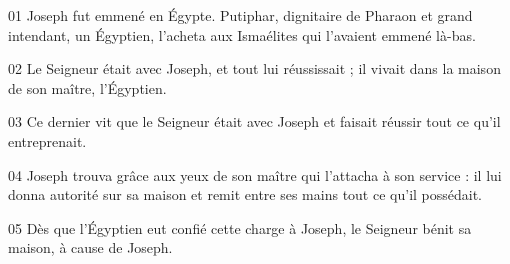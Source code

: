 01 Joseph fut emmené en Égypte. Putiphar, dignitaire de Pharaon et grand intendant, un Égyptien, l’acheta aux Ismaélites qui l’avaient emmené là-bas.

02 Le Seigneur était avec Joseph, et tout lui réussissait ; il vivait dans la maison de son maître, l’Égyptien.

03 Ce dernier vit que le Seigneur était avec Joseph et faisait réussir tout ce qu’il entreprenait.

04 Joseph trouva grâce aux yeux de son maître qui l’attacha à son service : il lui donna autorité sur sa maison et remit entre ses mains tout ce qu’il possédait.

05 Dès que l’Égyptien eut confié cette charge à Joseph, le Seigneur bénit sa maison, à cause de Joseph.